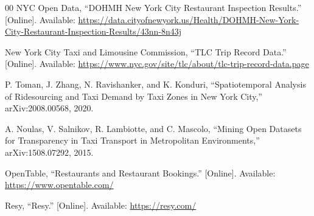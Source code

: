 \documentclass[conference]{IEEEtran}
\begin{document}
\begin{thebibliography}{00}
NYC Open Data, ``DOHMH New York City Restaurant Inspection Results.'' [Online]. Available: \url{https://data.cityofnewyork.us/Health/DOHMH-New-York-City-Restaurant-Inspection-Results/43nn-8n43j}

New York City Taxi and Limousine Commission, ``TLC Trip Record Data.'' [Online]. Available: \url{https://www.nyc.gov/site/tlc/about/tlc-trip-record-data.page}

P. Toman, J. Zhang, N. Ravishanker, and K. Konduri, ``Spatiotemporal Analysis of Ridesourcing and Taxi Demand by Taxi Zones in New York City,'' arXiv:2008.00568, 2020.

A. Noulas, V. Salnikov, R. Lambiotte, and C. Mascolo, ``Mining Open Datasets for Transparency in Taxi Transport in Metropolitan Environments,'' arXiv:1508.07292, 2015.

OpenTable, ``Restaurants and Restaurant Bookings.'' [Online]. Available: \url{https://www.opentable.com/}

Resy, ``Resy.'' [Online]. Available: \url{https://resy.com/}
\end{thebibliography}
\end{document}
